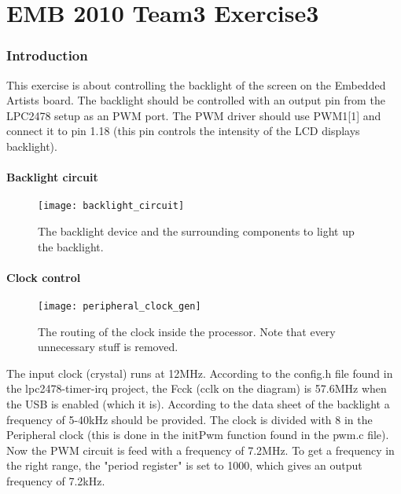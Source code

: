 

\part*{EMB 2010 Team3 Exercise3}
\section{Introduction}
This exercise is about controlling the backlight of the screen on the Embedded Artists board. 
The backlight should be controlled with an output pin from the LPC2478 setup as an PWM port.
The PWM driver should use PWM1[1] and connect it to pin 1.18 (this pin controls the intensity of the LCD displays backlight).
\subsection{Backlight circuit}

\begin{figure}[h!]		%
	\begin{centering}
 		\texttt{[image: backlight\_circuit]}
		\caption{The backlight device and the surrounding components to light up the backlight.}
	\end{centering}
\end{figure}

\subsection{Clock control}

\begin{figure}[h!]		%
	\begin{centering}
 		\texttt{[image: peripheral\_clock\_gen]}
		\caption{The routing of the clock inside the processor. Note that every unnecessary stuff is removed.}
	\end{centering}
\end{figure}
The input clock (crystal) runs at 12MHz. According to the config.h file found in the lpc2478-timer-irq project,
the Fcck (cclk on the diagram) is 57.6MHz when the USB is enabled (which it is). According to the data sheet of the
backlight a frequency of 5-40kHz should be provided. The clock is divided with 8 in the Peripheral clock (this is done in the 
initPwm function found in the pwm.c file). Now the PWM circuit is feed with a frequency of 7.2MHz. 
To get a frequency in the right range, the "period register" is set to 1000, which gives an output frequency of 7.2kHz. 
